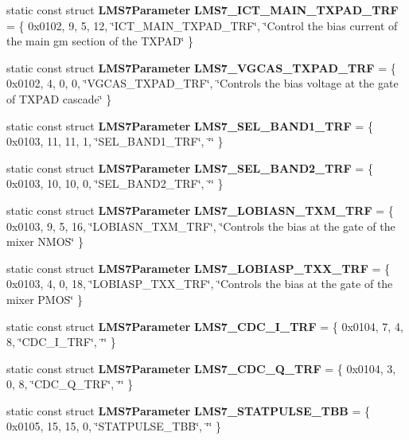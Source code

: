 \begin{DoxyCompactItemize}
\item 
static const struct {\bf L\+M\+S7\+Parameter} {\bf L\+M\+S7\+\_\+\+I\+C\+T\+\_\+\+M\+A\+I\+N\+\_\+\+T\+X\+P\+A\+D\+\_\+\+T\+RF} = \{ 0x0102, 9, 5, 12, \char`\"{}\+I\+C\+T\+\_\+\+M\+A\+I\+N\+\_\+\+T\+X\+P\+A\+D\+\_\+\+T\+R\+F\char`\"{}, \char`\"{}\+Control the bias current of the main gm section of the T\+X\+P\+A\+D\char`\"{} \}
\item 
static const struct {\bf L\+M\+S7\+Parameter} {\bf L\+M\+S7\+\_\+\+V\+G\+C\+A\+S\+\_\+\+T\+X\+P\+A\+D\+\_\+\+T\+RF} = \{ 0x0102, 4, 0, 0, \char`\"{}\+V\+G\+C\+A\+S\+\_\+\+T\+X\+P\+A\+D\+\_\+\+T\+R\+F\char`\"{}, \char`\"{}\+Controls the bias voltage at the gate of T\+X\+P\+A\+D cascade\char`\"{} \}
\item 
static const struct {\bf L\+M\+S7\+Parameter} {\bf L\+M\+S7\+\_\+\+S\+E\+L\+\_\+\+B\+A\+N\+D1\+\_\+\+T\+RF} = \{ 0x0103, 11, 11, 1, \char`\"{}\+S\+E\+L\+\_\+\+B\+A\+N\+D1\+\_\+\+T\+R\+F\char`\"{}, \char`\"{}\char`\"{} \}
\item 
static const struct {\bf L\+M\+S7\+Parameter} {\bf L\+M\+S7\+\_\+\+S\+E\+L\+\_\+\+B\+A\+N\+D2\+\_\+\+T\+RF} = \{ 0x0103, 10, 10, 0, \char`\"{}\+S\+E\+L\+\_\+\+B\+A\+N\+D2\+\_\+\+T\+R\+F\char`\"{}, \char`\"{}\char`\"{} \}
\item 
static const struct {\bf L\+M\+S7\+Parameter} {\bf L\+M\+S7\+\_\+\+L\+O\+B\+I\+A\+S\+N\+\_\+\+T\+X\+M\+\_\+\+T\+RF} = \{ 0x0103, 9, 5, 16, \char`\"{}\+L\+O\+B\+I\+A\+S\+N\+\_\+\+T\+X\+M\+\_\+\+T\+R\+F\char`\"{}, \char`\"{}\+Controls the bias at the gate of the mixer N\+M\+O\+S\char`\"{} \}
\item 
static const struct {\bf L\+M\+S7\+Parameter} {\bf L\+M\+S7\+\_\+\+L\+O\+B\+I\+A\+S\+P\+\_\+\+T\+X\+X\+\_\+\+T\+RF} = \{ 0x0103, 4, 0, 18, \char`\"{}\+L\+O\+B\+I\+A\+S\+P\+\_\+\+T\+X\+X\+\_\+\+T\+R\+F\char`\"{}, \char`\"{}\+Controls the bias at the gate of the mixer P\+M\+O\+S\char`\"{} \}
\item 
static const struct {\bf L\+M\+S7\+Parameter} {\bf L\+M\+S7\+\_\+\+C\+D\+C\+\_\+\+I\+\_\+\+T\+RF} = \{ 0x0104, 7, 4, 8, \char`\"{}\+C\+D\+C\+\_\+\+I\+\_\+\+T\+R\+F\char`\"{}, \char`\"{}\char`\"{} \}
\item 
static const struct {\bf L\+M\+S7\+Parameter} {\bf L\+M\+S7\+\_\+\+C\+D\+C\+\_\+\+Q\+\_\+\+T\+RF} = \{ 0x0104, 3, 0, 8, \char`\"{}\+C\+D\+C\+\_\+\+Q\+\_\+\+T\+R\+F\char`\"{}, \char`\"{}\char`\"{} \}
\item 
static const struct {\bf L\+M\+S7\+Parameter} {\bf L\+M\+S7\+\_\+\+S\+T\+A\+T\+P\+U\+L\+S\+E\+\_\+\+T\+BB} = \{ 0x0105, 15, 15, 0, \char`\"{}\+S\+T\+A\+T\+P\+U\+L\+S\+E\+\_\+\+T\+B\+B\char`\"{}, \char`\"{}\char`\"{} \}

\end{DoxyCompactItemize}
